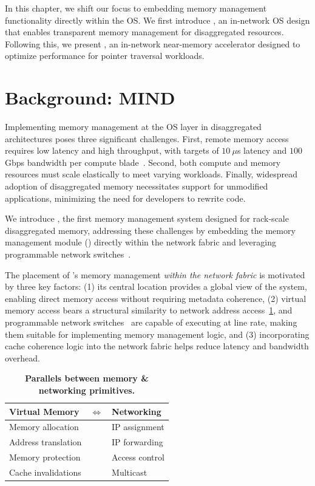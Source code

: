 In this chapter, we shift our focus to embedding memory management functionality directly within the OS. We first introduce \mind, an in-network OS design that enables transparent memory management for disaggregated resources. Following this, we present \pulse, an in-network near-memory accelerator designed to optimize performance for pointer traversal workloads.


\section{Background: MIND}
\label{sec:mindbackground}




Implementing memory management at the OS layer in disaggregated architectures poses three significant challenges. First, remote memory access requires low latency and high throughput, with targets of $10~\mu$s latency and $100$ Gbps bandwidth per compute blade~\cite{legoos, infiniswap, fastswap, disagg}. Second, both compute and memory resources must scale elastically to meet varying workloads. Finally, widespread adoption of disaggregated memory necessitates support for unmodified applications, minimizing the need for developers to rewrite code.

We introduce \mind, the first memory management system designed for rack-scale disaggregated memory, addressing these challenges by embedding the memory management module (\mmm) directly within the network fabric and leveraging programmable network switches~\cite{progswitch1, progswitch2}.

The placement of \mind's memory management \textit{within the network fabric} is motivated by three key factors: (1) its central location provides a global view of the system, enabling direct memory access without requiring metadata coherence, (2) virtual memory access bears a structural similarity to network address access~\ref{table:isomorph}, and programmable network switches~\cite{progswitch1} are capable of executing at line rate, making them suitable for implementing memory management logic, and (3) incorporating cache coherence logic into the network fabric helps reduce latency and bandwidth overhead.

\begin{table}
    \caption[Parallels between memory \& networking primitives]{\small \textbf{Parallels between memory \& networking primitives.}}
    \label{table:isomorph}
    \centering
    \scriptsize
    \renewcommand{\arraystretch}{1.2}
    \begin{tabular}{p{3cm} p{1cm}p{3cm}}
      \hline
      \textbf{Virtual Memory} &$\Longleftrightarrow$ &\textbf{Networking} \\\hline\hline
      Memory allocation&&IP assignment\\
      Address translation &&IP forwarding\\
      Memory protection  &&Access control\\
      Cache invalidations &&Multicast\\
      \hline
    \end{tabular}
\end{table}

